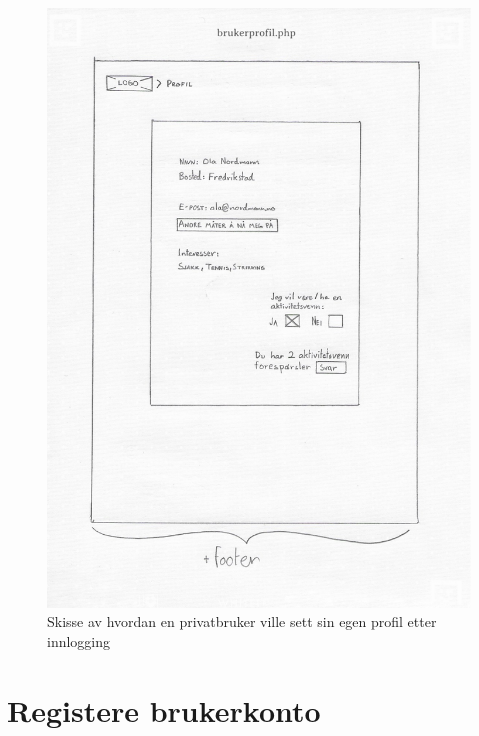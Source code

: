 \begin{figure}[H]
\centering
\includegraphics[width=.9\textwidth]{Illustrasjoner/Skisser-pdf/1.0/1-16-innlogget-brukerprofil.pdf}
\caption{Skisse av hvordan en privatbruker ville sett sin egen profil etter innlogging}
\label{vedlegg:1-16-innlogget-bruker}
\end{figure}

\section{Registere brukerkonto}

